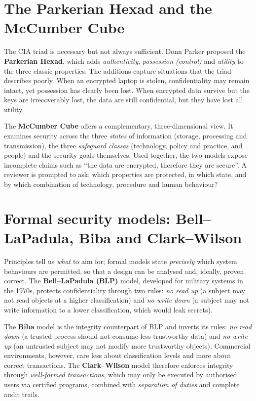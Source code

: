 \documentclass[11pt,openany]{book}
\begin{document}
\section{The Parkerian Hexad and the McCumber Cube}\label{sec:1.6}
The CIA triad is necessary but not always sufficient. Donn Parker proposed the \textbf{Parkerian Hexad}, which adds \emph{authenticity}, \emph{possession (control)} and \emph{utility} to the three classic properties. The additions capture situations that the triad describes poorly. When an encrypted laptop is stolen, confidentiality may remain intact, yet possession has clearly been lost. When encrypted data survive but the keys are irrecoverably lost, the data are still confidential, but they have lost all utility.

The \textbf{McCumber Cube} offers a complementary, three-dimensional view. It examines security across the three \emph{states} of information (storage, processing and transmission), the three \emph{safeguard classes} (technology, policy and practice, and people) and the security goals themselves. Used together, the two models expose incomplete claims such as ``the data are encrypted, therefore they are secure''. A reviewer is prompted to ask: which properties are protected, in which state, and by which combination of technology, procedure and human behaviour?

\section{Formal security models: Bell–LaPadula, Biba and Clark–Wilson}\label{sec:1.7}
Principles tell us \emph{what} to aim for; formal models state \emph{precisely} which system behaviours are permitted, so that a design can be analysed and, ideally, proven correct. The \textbf{Bell–LaPadula (BLP)} model, developed for military systems in the 1970s, protects confidentiality through two rules: \emph{no read up} (a subject may not read objects at a higher classification) and \emph{no write down} (a subject may not write information to a lower classification, which would leak secrets).

The \textbf{Biba} model is the integrity counterpart of BLP and inverts its rules: \emph{no read down} (a trusted process should not consume less trustworthy data) and \emph{no write up} (an untrusted subject may not modify more trustworthy objects). Commercial environments, however, care less about classification levels and more about correct transactions. The \textbf{Clark–Wilson} model therefore enforces integrity through \emph{well-formed transactions}, which may only be executed by authorised users via certified programs, combined with \emph{separation of duties} and complete audit trails.
\end{document}
